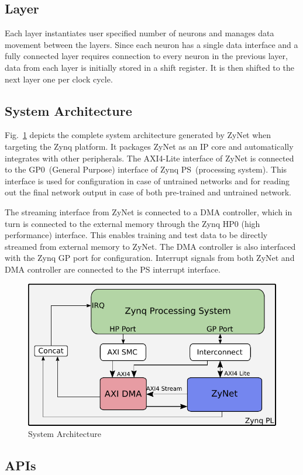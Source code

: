 \subsection{Layer}
Each layer instantiates user specified number of neurons and manages data movement between the layers.
Since each neuron has a single data interface and a fully connected layer requires connection to every neuron in the previous layer, data from each layer is initially stored in a shift register.
It is then shifted to the next layer one per clock cycle.

\subsection{System Architecture}
Fig.~\ref{fig:sysarch} depicts the complete system architecture generated by ZyNet when targeting the Zynq platform.
It packages ZyNet as an IP core and automatically integrates with other peripherals.
The AXI4-Lite interface of ZyNet is connected to the GP0~(General Purpose) interface of Zynq PS~(processing system).
This interface is used for configuration in case of untrained networks and for reading out the final network output in case of both pre-trained and untrained network.

The streaming interface from ZyNet is connected to a DMA controller, which in turn is connected to the external memory through the Zynq HP0 (high performance) interface.
This enables training and test data to be directly streamed from external memory to ZyNet.
The DMA controller is also interfaced with the Zynq GP port for configuration.
Interrupt signals from both ZyNet and DMA controller are connected to the PS interrupt interface.
 
\begin{figure}[!t]
\centering
   \includegraphics[width=0.8\columnwidth]{Figures/arch.pdf}
   \caption{System Architecture}
   \vspace{-3mm}
   \label{fig:sysarch}
\end{figure}


\subsection{APIs}


